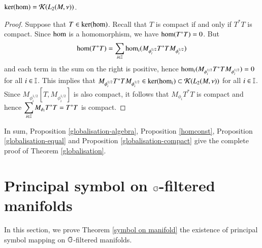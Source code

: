 \documentclass[leqno]{amsart}
\begin{document}
	\begin{proposition}\label{globalisation-compact}
		$\ker({\rm hom})={\mathcal K}(L_2(M,\nu))$.
	\end{proposition}
	\begin{proof}
		Suppose that $T\in\ker({\rm hom})$. Recall that $T$ is compact if and only if $T^*T$ is compact. Since ${\rm hom}$ is a homomorphism, we have ${\rm hom}(T^*T)=0$. But
		$${\rm hom}(T^*T)=\sum_{i\in\mathbb I}{\rm hom}_i(M_{\phi_i^{1/2}}T^*TM_{\phi_i^{1/2}})$$
		and each term in the sum on the right is positive, hence ${\rm hom}_i(M_{\phi_i^{1/2}}T^*TM_{\phi_i^{1/2}})=0$ for all $i\in\mathbb I$. This implies that $M_{\phi_i^{1/2}}T^*TM_{\phi_i^{1/2}}\in\ker({\rm hom}_i)\subset{\mathcal K}(L_2(M,\nu))$ for all $i\in\mathbb I$. Since $M_{\phi_i^{1/2}}[T, M_{\phi_i^{1/2}}]$ is also compact, it follows that $M_{\phi_i}T^*T$ is compact and hence $\displaystyle\sum_{i\in\mathbb I} M_{\phi_i}T^*T=T^*T$ is compact.
	\end{proof}
	
	In sum, Proposition \ref{globalisation-algebra}, Proposition \ref{homconst}, Proposition \ref{globalisation-equal} and Proposition \ref{globalisation-compact} give the complete proof of Theorem \ref{globalisation}.
	
	
	
	
	
	
	\section{Principal symbol on $\mathbb{G}$-filtered manifolds}\label{symbol on Carnot manifolds}
 
	In this section, we prove Theorem \ref{symbol on manifold} the existence of principal symbol mapping on $\mathbb{G}$-filtered manifolds.
	
	
\end{document}
